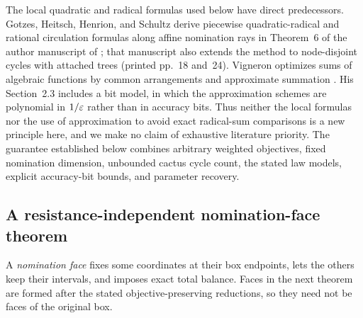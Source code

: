 The local quadratic and radical formulas used below have direct
predecessors. Gotzes, Heitsch, Henrion, and Schultz derive piecewise
quadratic-radical and rational circulation formulas along affine
nomination rays in Theorem~6 of the author manuscript of
\citet{gotzes2016-quantification}; that manuscript also extends the
method to node-disjoint cycles with attached trees (printed pp.~18
and~24). Vigneron optimizes sums of algebraic functions by common
arrangements and approximate summation
\citep[Theorem~6 and Section~3.2 of the October~21, 2011 author manuscript]{vigneron2014-geometric-optimization-and-sums-of}.
His Section~2.3 includes a bit model, in which the approximation schemes
are polynomial in $1/\varepsilon$ rather than in accuracy bits. Thus neither the
local formulas nor the use of approximation to avoid exact radical-sum
comparisons is a new principle here, and we make no claim of exhaustive
literature priority. The guarantee established below combines arbitrary
weighted objectives, fixed nomination dimension, unbounded cactus cycle
count, the stated law models, explicit accuracy-bit bounds, and parameter
recovery.

\subsection{A resistance-independent nomination-face theorem}

A \emph{nomination face} fixes some coordinates at their box endpoints,
lets the others keep their intervals, and imposes exact total balance.
Faces in the next theorem are formed after the stated
objective-preserving reductions, so they need not be faces of the original
box.

